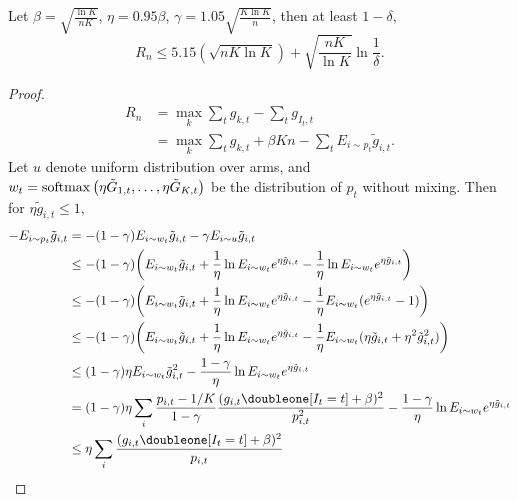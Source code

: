 \begin{thm}
    Let $\beta=\sqrt{\frac{\ln K}{nK}}$, $\eta=0.95\beta$,
    $\gamma=1.05\sqrt{\frac{K\ln K}{n}}$, then \wprob at least $1-\delta$,
    \begin{equation}
        R_n\le 5.15(\sqrt{nK\ln K}) + \sqrt{\frac{nK}{\ln K}}\ln\frac{1}{\delta}.
    \end{equation}
\end{thm}
\begin{proof}
    \begin{align}
        R_n
            &= \max_k\sum_t g_{k,t} - \sum_t g_{I_t, t} \\
            &= \max_k\sum_t g_{k,t} + \beta K n - \sum_t E_{i\sim p_t}\tilde g_{i, t}.
    \end{align}
    Let $u$ denote uniform distribution over arms, and
    $w_t=\mathop{\mathrm{softmax}}\big(\eta\tilde G_{1,t},\dots,\eta\tilde G_{K,t}\big)$
    be the distribution of $p_t$ without mixing.
    Then for $\eta\tilde g_{i,t}\le 1$,
    \begin{align}
        - E_{i\sim p_t}\tilde g_{i, t}
            &= - (1-\gamma) E_{i\sim w_t} \tilde g_{i, t} - \gamma E_{i\sim u}\tilde g_{i, t}\\
            &\le - (1-\gamma)\bigg( E_{i\sim w_t} \tilde g_{i, t}
                +\frac{1}{\eta}\ln E_{i\sim w_t} e^{\eta\tilde g_{i,t}}
                -\frac{1}{\eta}\ln E_{i\sim w_t} e^{\eta\tilde g_{i,t}}
                \bigg) \\
            &\le - (1-\gamma)\bigg( E_{i\sim w_t} \tilde g_{i, t}
                +\frac{1}{\eta}\ln E_{i\sim w_t} e^{\eta\tilde g_{i,t}}
                -\frac{1}{\eta}E_{i\sim w_t} (e^{\eta\tilde g_{i,t}}-1)
                \bigg) \\
            &\le - (1-\gamma)\bigg( E_{i\sim w_t} \tilde g_{i, t}
                +\frac{1}{\eta}\ln E_{i\sim w_t} e^{\eta\tilde g_{i,t}}
                -\frac{1}{\eta}E_{i\sim w_t} (\eta\tilde g_{i,t} + \eta^2\tilde g_{i,t}^2)
                \bigg) \\
            &\le (1-\gamma)\eta
                E_{i\sim w_t} \tilde g_{i,t}^2
                - \frac{1-\gamma}{\eta} \ln E_{i\sim w_t} e^{\eta\tilde g_{i,t}} \\
            &= (1-\gamma)\eta
                \sum_{i}\frac{p_{i,t}-1/K}{1-\gamma} \frac{(g_{i,t}\doubleone[I_t=t]+\beta)^2}{p_{i,t}^2}
                - \frac{1-\gamma}{\eta} \ln E_{i\sim w_t} e^{\eta\tilde g_{i,t}} \\
            &\le \eta \sum_{i} \frac{(g_{i,t}\doubleone[I_t=t]+\beta)^2}{p_{i,t}}

\end{align}
\end{proof}
